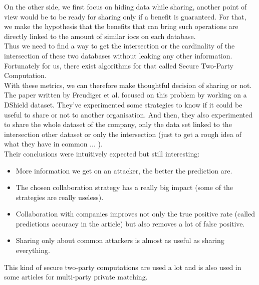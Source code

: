 \documentclass{eplmastersthesis}
\begin{document}
On the other side, we first focus on hiding data while sharing, another point of view would be to be ready for sharing only if a benefit is guaranteed. For that, we make the hypothesis that the benefits that can bring such operations are directly linked to the amount of similar \gls{ioc}s on each database.\\
Thus we need to find a way to get the intersection or the cardinality of the intersection of these two databases without leaking any other information. Fortunately for us, there exist algorithms for that called Secure Two-Party Computation.\\
With these metrics, we can therefore make thoughtful decision of sharing or not.\\
The paper written by Freudiger et al.\cite{freudiger2015controlled} focused on this problem by working on a DShield dataset. They've experimented some strategies to know if it could be useful to share or not to another organisation. And then, they also experimented to share the whole dataset of the company, only the data set linked to the intersection other dataset or only the intersection (just to get a rough idea of what they have in common ... ).\\
Their conclusions were intuitively expected but still interesting:
\begin{itemize}
\item More information we get on an attacker, the better the prediction are.
\item The chosen collaboration strategy has a really big impact (some of the strategies are really useless).
\item Collaboration with companies improves not only the true positive rate (called predictions accuracy in the article) but also removes a lot of false positive.
\item Sharing only about common attackers is almost as useful as sharing everything.
\end{itemize}

This kind of secure two-party computations are used a lot and is also used in some articles for multi-party private matching. 
\end{document}
